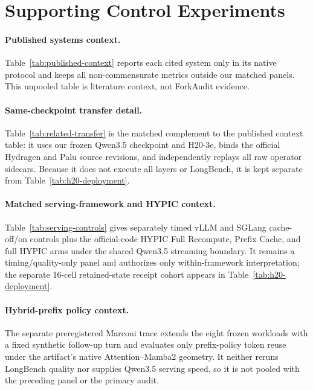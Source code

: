 \documentclass{article}
\begin{document}
\section{Supporting Control Experiments}
\label{app:controls}

\paragraph{Published systems context.}
Table~\ref{tab:published-context} reports each cited system only in its native
protocol and keeps all non-commensurate metrics outside our matched panels.
This unpooled table is literature context, not ForkAudit evidence.


\paragraph{Same-checkpoint transfer detail.}
Table~\ref{tab:related-transfer} is the matched complement to the published
context table: it uses our frozen Qwen3.5 checkpoint and H20-3e, binds the
official Hydragen and Palu source revisions, and independently replays all raw
operator sidecars.  Because it does not execute all layers or LongBench, it is
kept separate from Table~\ref{tab:h20-deployment}.


\paragraph{Matched serving-framework and HYPIC context.}
Table~\ref{tab:serving-controls} gives separately timed vLLM and SGLang
cache-off/on controls plus the official-code HYPIC Full Recompute, Prefix
Cache, and full HYPIC arms under the shared Qwen3.5 streaming boundary.  It
remains a timing/quality-only panel and authorizes only within-framework
interpretation; the separate 16-cell retained-state receipt cohort appears in
Table~\ref{tab:h20-deployment}.


\paragraph{Hybrid-prefix policy context.}
The separate preregistered Marconi trace extends the eight frozen workloads
with a fixed synthetic follow-up turn and evaluates only prefix-policy token
reuse under the artifact's native Attention--Mamba2 geometry.  It neither
reruns LongBench quality nor supplies Qwen3.5 serving speed, so it is not
pooled with the preceding panel or the primary audit.

\end{document}
